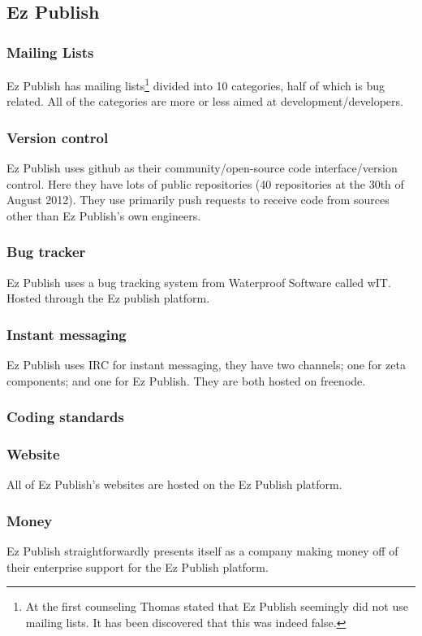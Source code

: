 \documentclass{report} %
\begin{document}
\subsection{Ez Publish}
\subsubsection{Mailing Lists}
Ez Publish has mailing lists\cite{ezpubwebmaillists}\footnote{At the first counseling Thomas stated that Ez Publish seemingly did not use mailing lists. It has been discovered that this was indeed false.} divided into 10 categories, half of which is bug related. All of the categories are more or less aimed at development/developers.
\subsubsection{Version control}
Ez Publish uses github\cite{ezpubgithub} as their community/open-source code interface/version control. Here they have lots of public repositories (40 repositories at the 30th of August 2012). They use primarily push requests to receive code from sources other than Ez Publish's own engineers. %
\subsubsection{Bug tracker}
Ez Publish uses a bug tracking system from Waterproof Software\cite{waterproofweb} called wIT\cite{waterproofwebwit}. Hosted through the Ez publish platform.
\subsubsection{Instant messaging}
Ez Publish uses IRC for instant messaging, they have two channels; one for zeta components; and one for Ez Publish. They are both hosted on freenode.
\subsubsection{Coding standards}
\subsubsection{Website}
All of Ez Publish's websites are hosted on the Ez Publish platform.
\subsubsection{Money}
Ez Publish straightforwardly presents itself as a company making money off of their enterprise support for the Ez Publish platform.
\end{document}
